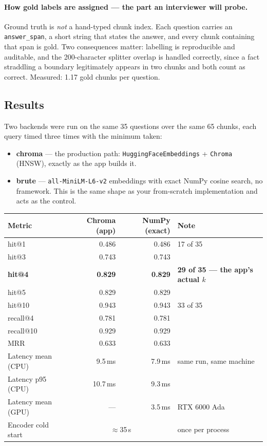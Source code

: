 \documentclass[11pt,a4paper]{article}
\begin{document}
\paragraph{How gold labels are assigned --- the part an interviewer will probe.}
Ground truth is \emph{not} a hand-typed chunk index. Each question carries an
\texttt{answer\_span}, a short string that states the answer, and every chunk
containing that span is gold. Two consequences matter: labelling is reproducible
and auditable, and the 200-character splitter overlap is handled correctly, since
a fact straddling a boundary legitimately appears in two chunks and both count as
correct. Measured: 1.17 gold chunks per question.

\subsection{Results}

Two backends were run on the same 35 questions over the same 65 chunks, each
query timed three times with the minimum taken:

\begin{itemize}
  \item \textbf{chroma} --- the production path:
        \texttt{HuggingFaceEmbeddings} + \texttt{Chroma} (HNSW), exactly as the
        app builds it.
  \item \textbf{brute} --- \texttt{all-MiniLM-L6-v2} embeddings with exact NumPy
        cosine search, no framework. This is the same shape as your from-scratch
        implementation and acts as the control.
\end{itemize}

\begin{center}
\begin{tabular}{@{}lrrl@{}}
\toprule
\textbf{Metric} & \textbf{Chroma (app)} & \textbf{NumPy (exact)} & \textbf{Note} \\
\midrule
hit@1              & 0.486 & 0.486 & 17 of 35 \\
hit@3              & 0.743 & 0.743 & \\
\textbf{hit@4}     & \textbf{0.829} & \textbf{0.829} & \textbf{29 of 35 --- the app's actual $k$} \\
hit@5              & 0.829 & 0.829 & \\
hit@10             & 0.943 & 0.943 & 33 of 35 \\
\midrule
recall@4           & 0.781 & 0.781 & \\
recall@10          & 0.929 & 0.929 & \\
MRR                & 0.633 & 0.633 & \\
\midrule
Latency mean (CPU) & 9.5\,ms & 7.9\,ms & same run, same machine \\
Latency p95 (CPU)  & 10.7\,ms & 9.3\,ms & \\
Latency mean (GPU) & --- & 3.5\,ms & RTX 6000 Ada \\
\midrule
Encoder cold start & \multicolumn{2}{c}{$\approx$35\,s} & once per process \\
\bottomrule
\end{tabular}
\end{center}
\end{document}
